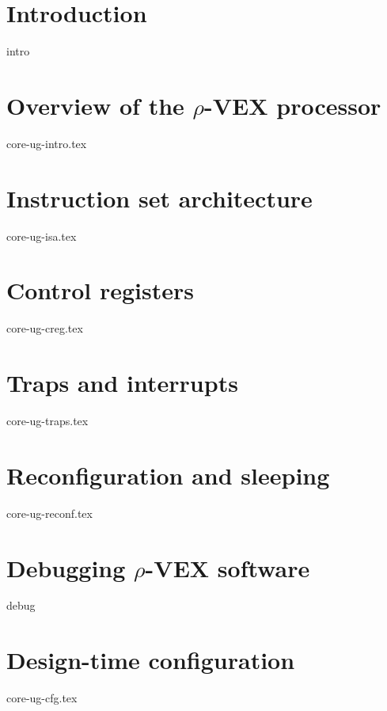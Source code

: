 \documentclass[11pt,twoside]{ce}
\newcommand{\rvex}{\texorpdfstring{$\rho$}{r}-VEX}
\begin{document}
\let\subsection\actualsection
\let\subsubsection\actualsubsection
\let\paragraph\actualsubsubsection

\chapter{Introduction}
{intro}

\chapter{Overview of the \rvex{} processor}
{core-ug-intro.tex}

\chapter{Instruction set architecture}
{core-ug-isa.tex}

\chapter{Control registers}
{core-ug-creg.tex}

\chapter{Traps and interrupts}
{core-ug-traps.tex}

\chapter{Reconfiguration and sleeping}
{core-ug-reconf.tex}

\chapter{Debugging \rvex{} software}
{debug}

\chapter{Design-time configuration}
{core-ug-cfg.tex}
\end{document}
